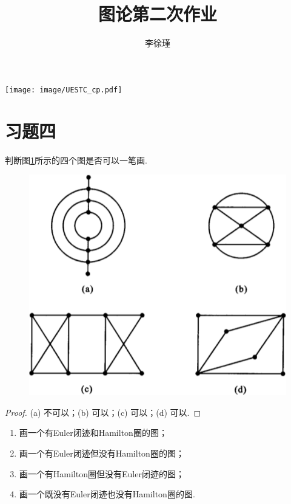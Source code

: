 \documentclass[cn,blue,normal,founder,11pt]{elegantnote}
\title{图论第二次作业}
\institute{数数学科学学院}
\author{李徐瑾\quad 202021110109}
\date{\zhtoday}
\begin{document}
\maketitle

\centerline{\texttt{[image: image/UESTC\_cp.pdf]}}
\section{习题四}

\begin{example}
判断图\ref{fig:4.1}所示的四个图是否可以一笔画.
\begin{figure}[h]
  \centering
  \includegraphics[scale=0.50]{image/ex1.pdf}
  \caption{}
  \label{fig:4.1}
\end{figure}
\end{example}

\begin{proof}
(a) 不可以；(b) 可以；(c) 可以；(d) 可以.
\end{proof}

\begin{example}
\begin{enumerate}[(1)]
\item 画一个有Euler闭迹和Hamilton圈的图；
\item 画一个有Euler闭迹但没有Hamilton圈的图；
\item 画一个有Hamilton圈但没有Euler闭迹的图；
\item 画一个既没有Euler闭迹也没有Hamilton圈的图.
\end{enumerate}
\end{example}
\end{document}

